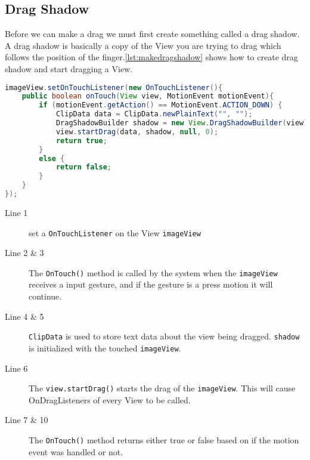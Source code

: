 \subsection*{Drag Shadow}
Before we can make a drag we must first create something called a drag shadow. A drag shadow is basically a copy of the View you are trying to drag which follows the position of the finger.\autoref{lst:makedragshadow} shows how to create drag shadow and start dragging a View.
\begin{lstlisting}[language=java,firstnumber=1,caption={How to create a drag shadow, and start drag},label=lst:makedragshadow]
imageView.setOnTouchListener(new OnTouchListener(){
	public boolean onTouch(View view, MotionEvent motionEvent){
		if (motionEvent.getAction() == MotionEvent.ACTION_DOWN) {
			ClipData data = ClipData.newPlainText("", "");
			DragShadowBuilder shadow = new View.DragShadowBuilder(view);
			view.startDrag(data, shadow, null, 0);
			return true;
		}
		else {
			return false;
		}	
	}
});
\end{lstlisting}
\begin{description}
\item[Line 1] set a \lstinline|OnTouchListener| on the View \lstinline|imageView|
\item[Line 2 \& 3] The \lstinline|OnTouch()| method is called by the system when the \lstinline|imageView| receives a input gesture, and if the gesture is a press motion it will continue.
\item[Line 4 \& 5] \lstinline|ClipData| is used to store text data about the view being dragged. \lstinline|shadow| is initialized with the touched \lstinline|imageView|.
\item[Line 6] The \lstinline|view.startDrag()| starts the drag of the \lstinline|imageView|. This will cause OnDragListeners of every View to be called. 
\item[Line 7 \& 10] The \lstinline|OnTouch()| method returns either true or false based on if the motion event was handled or not.
\end{description}
